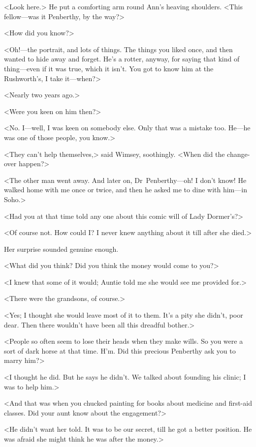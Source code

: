 <Look here.> He put a comforting arm round Ann's heaving shoulders. <This fellow—was it Penberthy, by the way?>

<How did you know?>

<Oh!—the portrait, and lots of things. The things you liked once, and then wanted to hide away and forget. He's a rotter, anyway, for saying that kind of thing—even if it was true, which it isn't. You got to know him at the Rushworth's, I take it—when?>

<Nearly two years ago.>

<Were you keen on him then?>

<No. I—well, I was keen on somebody else. Only that was a mistake too. He—he was one of those people, you know.>

<They can't help themselves,> said Wimsey, soothingly. <When did the change-over happen?>

<The other man went away. And later on, Dr~Penberthy—oh! I don't know! He walked home with me once or twice, and then he asked me to dine with him—in Soho.>

<Had you at that time told any one about this comic will of Lady Dormer's?>

<Of course not. How could I\@? I never knew anything about it till after she died.>

Her surprise sounded genuine enough.

<What did you think? Did you think the money would come to you?>

<I knew that some of it would; Auntie told me she would see me provided for.>

<There were the grandsons, of course.>

<Yes; I thought she would leave most of it to them. It's a pity she didn't, poor dear. Then there wouldn't have been all this dreadful bother.>

<People so often seem to lose their heads when they make wills. So you were a sort of dark horse at that time. H'm. Did this precious Penberthy ask you to marry him?>

<I thought he did. But he says he didn't. We talked about founding his clinic; I was to help him.>

<And that was when you chucked painting for books about medicine and first-aid classes. Did your aunt know about the engagement?>

<He didn't want her told. It was to be our secret, till he got a better position. He was afraid she might think he was after the money.>

